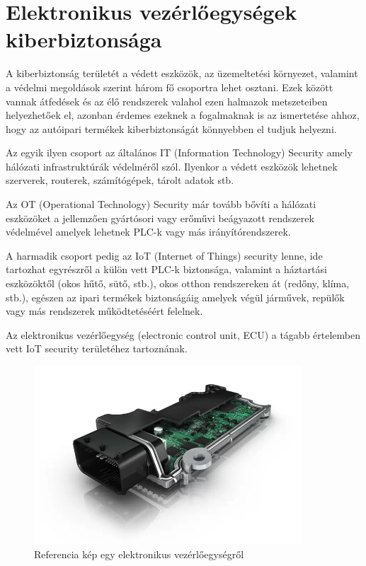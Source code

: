 \section{Elektronikus vezérlőegységek kiberbiztonsága}

A kiberbiztonság területét a védett eszközök, az üzemeltetési környezet, valamint a védelmi megoldások szerint három fő csoportra lehet osztani. Ezek között vannak átfedések és az élő rendszerek valahol ezen halmazok metszeteiben helyezhetőek el, azonban érdemes ezeknek a fogalmaknak is az ismertetése ahhoz, hogy az autóipari termékek kiberbiztonságát könnyebben el tudjuk helyezni. 

Az egyik ilyen csoport az általános IT (Information Technology) Security amely hálózati infrastruktúrák védelméről szól. Ilyenkor a védett eszközök lehetnek szerverek, routerek, számítógépek, tárolt adatok stb. 

Az OT (Operational Technology) Security már tovább bővíti a hálózati eszközöket a jellemzően gyártósori vagy erőművi beágyazott rendszerek védelmével amelyek lehetnek PLC-k vagy más irányítórendszerek.

A harmadik csoport pedig az IoT (Internet of Things) security lenne, ide tartozhat egyrészről a külön vett PLC-k biztonsága, valamint a háztartási eszközöktől (okos hűtő, sütő, stb.), okos otthon rendszereken át (redőny, klíma, stb.), egészen az ipari termékek biztonságáig amelyek végül járművek, repülők vagy más rendszerek működtetéséért felelnek.

Az elektronikus vezérlőegység (electronic control unit, ECU) a tágabb értelemben vett IoT security területéhez tartoznának. \\

\begin{figure}[!ht]
	\centering
	\includegraphics[width=100mm, keepaspectratio]{figures/ecu.png}
	\caption{Referencia kép egy elektronikus vezérlőegységről\cite{ecu}}
	\label{fig:ecu}
\end{figure}

